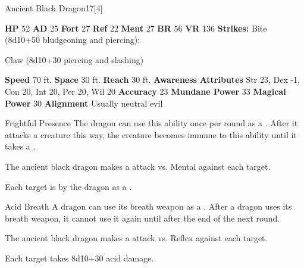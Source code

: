   \begin{monsubsection}{Ancient Black Dragon}{17}[4]
    \vspace{-1em}\vspace{-1em}
    \vspace{0em}

    
    

    \begin{spellcontent}
      \begin{spelltargetinginfo}
        \pari \textbf{HP} 52 \monsep
          \textbf{AD} 25 \monsep
          \textbf{Fort} 27 \monsep
          \textbf{Ref} 22 \monsep
          \textbf{Ment} 27
        \pari \textbf{BR} 56 \monsep
        \textbf{VR} 136
        \pari \textbf{Strikes:}
            Bite  (8d10+50 bludgeoning and piercing);
\par Claw  (8d10+30 piercing and slashing)
      \end{spelltargetinginfo}
    \end{spellcontent}
    \begin{monsterfooter}
      \pari \textbf{Speed} 70 ft. \monsep
        \textbf{Space} 30 ft. \monsep
        \textbf{Reach} 30 ft.
      \pari \textbf{Awareness} 
      \pari \textbf{Attributes}
        Str 23, Dex -1,
        Con 20, Int 20,
        Per 20, Wil 20
      \pari \textbf{Accuracy} 23 \monsep
        \textbf{Mundane Power} 33 \monsep
      \textbf{Magical Power} 30
      \pari \textbf{Alignment} Usually neutral evil
    \end{monsterfooter}
  \end{monsubsection}
  \begin{freeability}{Frightful Presence}
      The dragon can use this ability once per round as a .
      After it attacks a creature this way, the creature becomes immune to this ability until it takes a .
      \par The ancient black dragon makes a  attack
        vs. Mental against each target.
    
    \hit Each target is  by the dragon as a .
    \end{freeability}
  

    \begin{freeability}{Acid Breath}
      A dragon can use its breath weapon as a .
      After a dragon uses its breath weapon, it cannot use it again until after the end of the next round.
      \par The ancient black dragon makes a  attack
        vs. Reflex against each target.
    
    \hit Each target takes 8d10+30 acid damage.
    \end{freeability}
  
